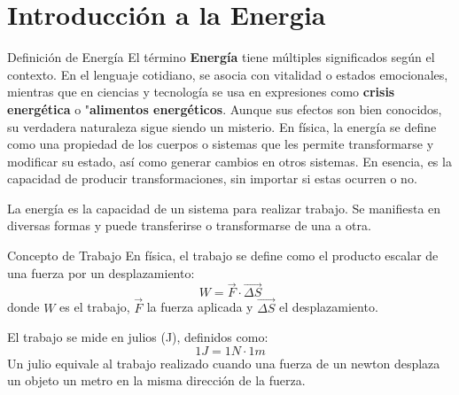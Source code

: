 \documentclass[main.tex]{subfiles}
\begin{document}
\section{Introducción a la Energia}
\begin{frame}{Definición de Energía}
  \justifying
  El término \textbf{Energía} tiene múltiples significados según el contexto. En el lenguaje cotidiano, se asocia con vitalidad o estados emocionales, mientras que en ciencias y tecnología se usa en expresiones como \textbf{crisis energética} o "\textbf{alimentos energéticos}. Aunque sus efectos son bien conocidos, su verdadera naturaleza sigue siendo un misterio. En física, la energía se define como una propiedad de los cuerpos o sistemas que les permite transformarse y modificar su estado, así como generar cambios en otros sistemas. En esencia, es la capacidad de producir transformaciones, sin importar si estas ocurren o no.
  
  La energía es la capacidad de un sistema para realizar trabajo. Se manifiesta en diversas formas y puede transferirse o transformarse de una a otra.
\end{frame}




\begin{frame}{Concepto de Trabajo}
  \justifying
  En física, el trabajo se define como el producto escalar de una fuerza por un desplazamiento:
  \begin{equation}
    W = \vec{F} \cdot \vec{\Delta S}
  \end{equation}
  donde $W$ es el trabajo, $\vec{F}$ la fuerza aplicada y $\vec{\Delta S}$ el desplazamiento.

  \justifying
  El trabajo se mide en julios (J), definidos como:
  \begin{equation}
    1 J = 1 N \cdot 1 m
  \end{equation}
  Un julio equivale al trabajo realizado cuando una fuerza de un newton desplaza un objeto un metro en la misma dirección de la fuerza.
\end{frame}
\end{document}
